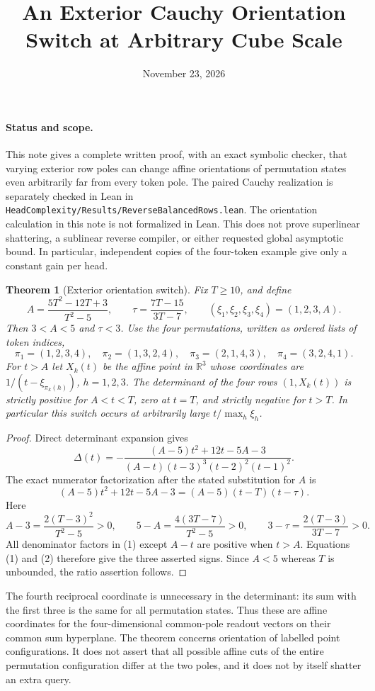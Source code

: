 \documentclass[11pt]{article}
\title{An Exterior Cauchy Orientation Switch at Arbitrary Cube Scale}
\author{}
\date{November 23, 2026}
\newtheorem{theorem}{Theorem}
\begin{document}
\maketitle

\paragraph{Status and scope.}
This note gives a complete written proof, with an exact symbolic checker,
that varying exterior row poles can change affine orientations of permutation
states even arbitrarily far from every token pole. The paired Cauchy
realization is separately checked in Lean in
\texttt{HeadComplexity/Results/ReverseBalancedRows.lean}.
The orientation calculation in this note is not formalized in Lean.
This does not prove superlinear shattering, a sublinear reverse compiler,
or either requested global asymptotic bound. In particular, independent
copies of the four-token example give only a constant gain per head.

\begin{theorem}[Exterior orientation switch]
Fix $T\geq10$, and define
\[
 A=\frac{5T^2-12T+3}{T^2-5},\qquad
 \tau=\frac{7T-15}{3T-7},\qquad
 (\xi_1,\xi_2,\xi_3,\xi_4)=(1,2,3,A).
\]
Then $3<A<5$ and $\tau<3$. Use the four permutations, written as
ordered lists of token indices,
\[
 \pi_1=(1,2,3,4),\quad \pi_2=(1,3,2,4),\quad
 \pi_3=(2,1,4,3),\quad \pi_4=(3,2,4,1).
\]
For $t>A$ let $X_k(t)$ be the affine point in $\mathbb R^3$ whose
coordinates are $1/(t-\xi_{\pi_k(h)})$, $h=1,2,3$.
The determinant of the four rows $(1,X_k(t))$ is strictly positive
for $A<t<T$, zero at $t=T$, and strictly negative for $t>T$.
In particular this switch occurs at arbitrarily large $t/\max_h\xi_h$.
\end{theorem}
\begin{proof}
Direct determinant expansion gives
\[
 \Delta(t)=
 -\frac{(A-5)t^2+12t-5A-3}
 {(A-t)(t-3)^3(t-2)^2(t-1)^2}.
 \tag{1}
\]
The exact numerator factorization after the stated substitution for $A$ is
\[
 (A-5)t^2+12t-5A-3=(A-5)(t-T)(t-\tau).
 \tag{2}
\]
Here
\[
 A-3=\frac{2(T-3)^2}{T^2-5}>0,\qquad
 5-A=\frac{4(3T-7)}{T^2-5}>0,\qquad
 3-\tau=\frac{2(T-3)}{3T-7}>0.
\]
All denominator factors in (1) except $A-t$ are positive when $t>A$.
Equations (1) and (2) therefore give the three asserted signs.
Since $A<5$ whereas $T$ is unbounded, the ratio assertion follows.
\end{proof}

The fourth reciprocal coordinate is unnecessary in the determinant:
its sum with the first three is the same for all permutation states.
Thus these are affine coordinates for the four-dimensional common-pole
readout vectors on their common sum hyperplane. The theorem concerns
orientation of labelled point configurations. It does not assert that
all possible affine cuts of the entire permutation configuration differ
at the two poles, and it does not by itself shatter an extra query.
\end{document}
